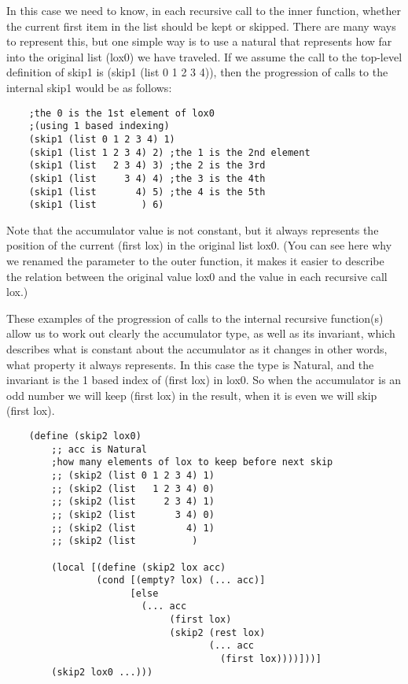 \documentclass[11pt,a4paper]{report}
\begin{document}
	In this case we need to know, in each recursive call to the inner function, whether the current first
	item in the list should be kept or skipped. There are many ways to represent this, but one simple
	way is to use a natural that represents how far into the original list (lox0) we have traveled. If we
	assume the call to the top-level definition of skip1 is (skip1 (list 0 1 2 3 4)), then the progression of
	calls to the internal skip1 would be as follows:
	
	\begin{verbatim}
	;the 0 is the 1st element of lox0 
	;(using 1 based indexing)
	(skip1 (list 0 1 2 3 4) 1)	
	(skip1 (list 1 2 3 4) 2) ;the 1 is the 2nd element
	(skip1 (list   2 3 4) 3) ;the 2 is the 3rd
	(skip1 (list     3 4) 4) ;the 3 is the 4th
	(skip1 (list       4) 5) ;the 4 is the 5th
	(skip1 (list        ) 6)
	\end{verbatim}
	
	Note that the accumulator value is not constant, but it always represents the position of the
	current (first lox) in the original list lox0. (You can see here why we renamed the parameter to the
	outer function, it makes it easier to describe the relation between the original value lox0 and the
	value in each recursive call lox.)
	
	These examples of the progression of calls to the internal recursive function(s) allow us to work
	out clearly the accumulator type, as well as its invariant, which describes what is constant about
	the accumulator as it changes in other words, what property it always represents. In this case the
	type is Natural, and the invariant is the 1 based index of (first lox) in lox0. So when the
	accumulator is an odd number we will keep (first lox) in the result, when it is even we will skip
	(first lox).
	
	\begin{verbatim}
	(define (skip2 lox0)
		;; acc is Natural
		;how many elements of lox to keep before next skip
		;; (skip2 (list 0 1 2 3 4) 1)
		;; (skip2 (list   1 2 3 4) 0)
		;; (skip2 (list     2 3 4) 1)
		;; (skip2 (list       3 4) 0)
		;; (skip2 (list         4) 1)
		;; (skip2 (list          )
		
		(local [(define (skip2 lox acc)
		        (cond [(empty? lox) (... acc)]
		              [else
		                (... acc
		                     (first lox)
		                     (skip2 (rest lox)
		                            (... acc 
		                              (first lox))))]))]
		(skip2 lox0 ...)))
	\end{verbatim}
	
\end{document}
